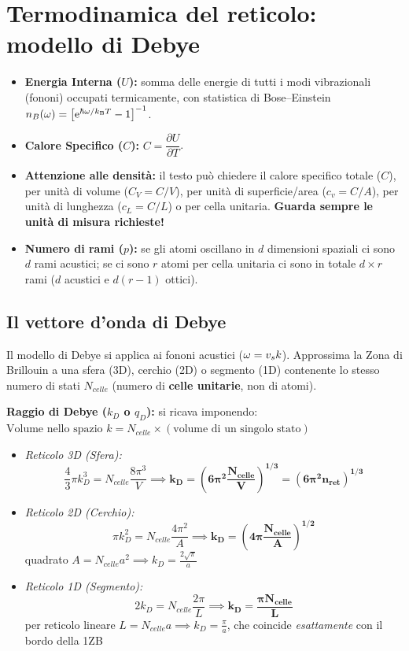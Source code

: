 \newpage

\section{Termodinamica del reticolo: modello di Debye}

\begin{itemize}
    \item \textbf{Energia Interna ($U$):} somma delle energie di tutti i modi vibrazionali (fononi) occupati termicamente, con statistica di Bose--Einstein $n_B(\omega)=\left[\mathrm{e}^{\hbar\omega/k_{\mathrm{B}} T}-1\right]^{-1}$.
    \item \textbf{Calore Specifico ($C$):} $C = \dfrac{\partial U}{\partial T}$.
    \item \textbf{Attenzione alle densità:} il testo può chiedere il calore specifico totale ($C$), per unità di volume ($C_V = C/V$), per unità di superficie/area ($c_v = C/A$), per unità di lunghezza ($c_L = C/L$) o per cella unitaria. \textbf{Guarda sempre le unità di misura richieste!}
    \item \textbf{Numero di rami ($p$):} se gli atomi oscillano in $d$ dimensioni spaziali ci sono $d$ rami acustici; se ci sono $r$ atomi per cella unitaria ci sono in totale $d\times r$ rami ($d$ acustici e $d(r-1)$ ottici).
\end{itemize}

\subsection{Il vettore d'onda di Debye}
Il modello di Debye si applica ai fononi acustici ($\omega = v_s k$). Approssima la Zona di Brillouin a una sfera (3D), cerchio (2D) o segmento (1D) contenente lo stesso numero di stati $N_{celle}$ (numero di \textbf{celle unitarie}, non di atomi).

\vspace{0.15cm}
\noindent\textbf{Raggio di Debye ($k_D$ o $q_D$):} si ricava imponendo: $ \text{Volume nello spazio } k = N_{celle} \times (\text{volume di un singolo stato})$

\begin{itemize}
    \item \textit{Reticolo 3D (Sfera):}
    \[ \frac{4}{3}\pi k_D^3 = N_{celle} \frac{8\pi^3}{V} \implies \bm{k_D = \left( 6\pi^2 \frac{N_{celle}}{V} \right)^{1/3} = (6\pi^2 n_{ret})^{1/3}} \]

    \item \textit{Reticolo 2D (Cerchio):}
    \[ \pi k_D^2 = N_{celle} \frac{4\pi^2}{A} \implies \bm{k_D = \left( 4\pi \frac{N_{celle}}{A} \right)^{1/2}} \]
    quadrato $A = N_{celle} a^2 \implies k_D = \frac{2\sqrt{\pi}}{a}$

    \item \textit{Reticolo 1D (Segmento):}
    \[ 2 k_D = N_{celle} \frac{2\pi}{L} \implies \bm{k_D = \frac{\pi N_{celle}}{L}} \]
    per reticolo lineare $L = N_{celle} a \implies k_D = \frac{\pi}{a}$, che coincide \emph{esattamente} con il bordo della 1ZB
\end{itemize}

